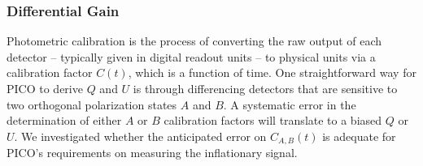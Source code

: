 \documentclass[PICOReport.tex]{subfiles}
\begin{document}



\subsubsection{Differential Gain}
\label{sec:gain_stability}

Photometric calibration is the process of converting the raw output of each detector -- typically given in digital readout units -- to physical units via a calibration factor $C(t)$, which is a function of time. One straightforward way for PICO to derive $Q$ and $U$ is through differencing detectors that are sensitive to two orthogonal polarization states $A$ and $B$. A systematic error in the determination of either $A$ or $B$ calibration factors will translate to a biased $Q$ or $U$. We investigated whether the anticipated error on $C_{A,B} (t)$ is adequate for PICO's requirements on measuring the inflationary signal.  
\end{document}
